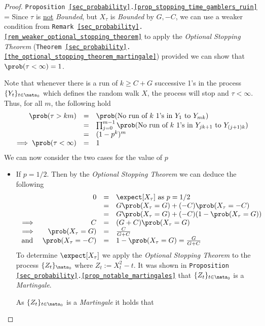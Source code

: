 \documentclass[11pt,a4paper]{article}
\begin{document}
  \begin{proof}{\texttt{Proposition \ref{sec_probability}.\ref{prop_stopping_time_gamblers_ruin}}}
    \everymath={\displaystyle}
    Since $\tau$ is \underline{not} \textit{Bounded}, but $X_\tau$ is \textit{Bounded} by $G,-C$, we can use a weaker condition from \texttt{Remark \ref{sec_probability}.\ref{rem_weaker_optional_stopping_theorem}} to apply the \textit{Optional Stopping Theorem} (\texttt{Theorem \ref{sec_probability}.\ref{the_optional_stopping_theorem_martingale}}) provided we can show that $\prob(\tau<\infty)=1$.
    \par Note that whenever there is a run of $k\geq C+G$ successive 1's in the process $\{Y_t\}_{t\in\nats_0}$ which defines the random walk $X$, the process will stop and $\tau<\infty$. Thus, for all $m$, the following hold
    \[\begin{array}{rcl}
      \prob(\tau>km)&=&\prob(\text{No run of }k\text{ 1's in }Y_1\text{ to }Y_{mk})\\
      &=&\prod_{j=0}^{m-1}\prob(\text{No run of }k\text{ 1's in }Y_{jk+1}\text{ to }Y_{(j+1)k})\\
      &=&(1-p^k)^m\\
      \implies\prob(\tau<\infty)&=&1
    \end{array}\]
    We can now consider the two cases for the value of $p$
    \begin{itemize}
      \item If $p=1/2$. Then by the \textit{Optional Stopping Theorem} we can deduce the following
      \[\begin{array}{rrcl}
        &0&=&\expect[X_\tau]\text{ as }p=1/2\\
        &&=&G\prob(X_\tau=G)+(-C)\prob(X_\tau=-C)\\
        &&=&G\prob(X_\tau=G)+(-C)(1-\prob(X_\tau=G))\\
        \implies&C&=&(G+C)\prob(X_\tau=G)\\
        \implies&\prob(X_\tau=G)&=&\frac{C}{G+C}\\
        \text{and }&\prob(X_\tau=-C)&=&1-\prob(X_\tau=G)=\frac{G}{G+C}
      \end{array}\]
      To determine $\expect[X_\tau]$ we apply the \textit{Optional Stopping Theorem} to the process $\{Z_t\}_{\nats_0}$ where $Z_t:=X_t^2-t$. It was shown in \texttt{Proposition \ref{sec_probability}.\ref{prop_notable_martingales}}  that $\{Z_t\}_{t\in\nats_0}$ is a \textit{Martingale}.
      \par As $\{Z_t\}_{t\in\nats_0}$ is a \textit{Martingale} it holds that

\end{itemize}
\end{proof}
\end{document}
